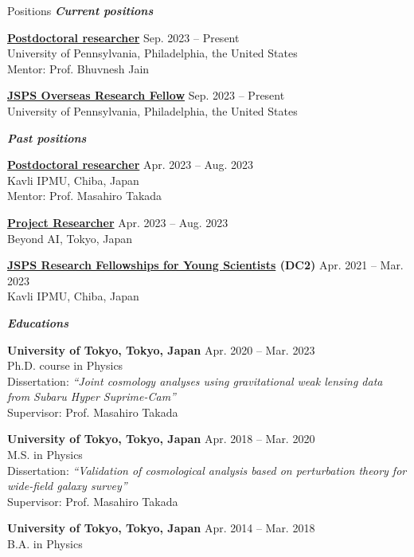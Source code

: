 \documentclass{sty/resume} %
\newcommand{\heading}[1]{\hspace{-1.5em}\noindent\textbf{\textit{#1}}}
\begin{document}
\begin{rSection}{Positions}
\heading{Current positions}

{\bf \href{https://www.physics.upenn.edu/people/sunao-sugiyama}{Postdoctoral researcher}} \hfill {Sep. 2023 -- Present}\\
University of Pennsylvania, Philadelphia, the United States\\
Mentor: Prof. Bhuvnesh Jain

{\bf \href{https://www.jsps.go.jp/english/e-ab/index.html}{JSPS Overseas Research Fellow}} \hfill {Sep. 2023 -- Present}\\
University of Pennsylvania, Philadelphia, the United States

\heading{Past positions}

{\bf \href{https://db.ipmu.jp/member/personal/5761en.html}{Postdoctoral researcher}} \hfill {Apr. 2023 -- Aug. 2023}\\
Kavli IPMU, Chiba, Japan\\
Mentor: Prof. Masahiro Takada

{\bf \href{https://beyondai.jp/contents/projects/murayama/?lang=en}{Project Researcher}} \hfill {Apr. 2023 -- Aug. 2023}\\
Beyond AI, Tokyo, Japan

{\bf \href{https://www.jsps.go.jp/english/e-pd/}{JSPS Research Fellowships for Young Scientists} (DC2)} \hfill {Apr. 2021 -- Mar. 2023}\\
Kavli IPMU, Chiba, Japan

\heading{Educations}

{\bf University of Tokyo, Tokyo, Japan}  \hfill {Apr. 2020 -- Mar. 2023}\\
Ph.D. course in Physics\\
Dissertation: \textit{``Joint cosmology analyses using gravitational weak lensing data from Subaru Hyper Suprime-Cam''}\\
Supervisor: Prof. Masahiro Takada

{\bf University of Tokyo, Tokyo, Japan}  \hfill {Apr. 2018 -- Mar. 2020}\\
M.S. in Physics\\
Dissertation: \textit{``Validation of cosmological analysis based on perturbation theory for wide-field galaxy survey''} \\
Supervisor: Prof. Masahiro Takada

{\bf University of Tokyo, Tokyo, Japan}  \hfill {Apr. 2014 -- Mar. 2018}\\
B.A. in Physics
\end{rSection}
\end{document}
